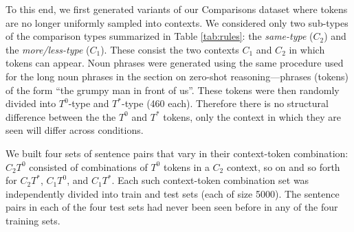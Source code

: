 

To this end, we first generated variants of our Comparisons dataset where tokens are no longer uniformly sampled into contexts. We considered only two sub-types of the comparison types summarized in Table \ref{tab:rules}: the \textit{same-type} ($C_{2}$) and the \textit{more/less-type} ($C_{1}$). These consist the two contexts $C_{1}$ and $C_{2}$ in which tokens can appear. Noun phrases were generated using the same procedure used for the long noun phrases in the section on zero-shot reasoning---phrases (tokens) of the form ``the grumpy man in front of us''. These tokens were then randomly divided into $T^{0}$-type and $T^{*}$-type (460 each). Therefore there is no structural difference between the the $T^{0}$ and $T^{*}$ tokens, only the context in which they are seen will differ across conditions. 

We built four sets of sentence pairs that vary in their context-token combination: $C_{2}T^{0}$ consisted of combinations of $T^{0}$ tokens in a $C_{2}$ context, so on and so forth for $C_{2}T^{*}$, $C_{1}T^{0}$, and $C_{1}T^{*}$. Each such context-token combination set was independently divided into train and test sets (each of size 5000). The sentence pairs in each of the four test sets had never been seen before in any of the four training sets. 

